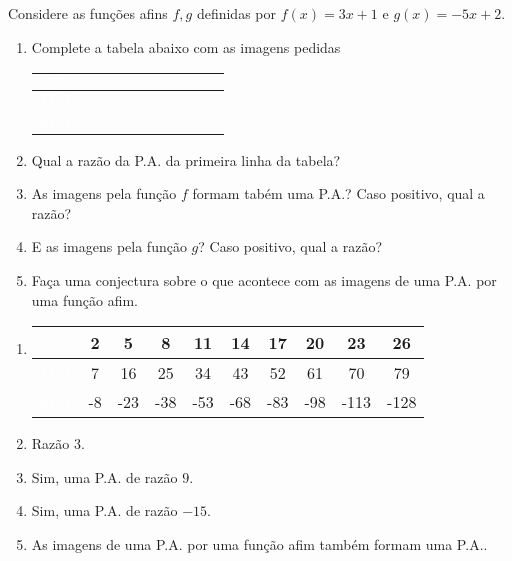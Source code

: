\documentclass[10 pt,usenames,dvipsnames, oneside]{article}
\begin{document}
Considere as funções afins $f,g$ definidas por $f(x)=3x+1$ e $g(x)=-5x+2$.
\begin{enumerate}
\item Complete a tabela abaixo com as imagens pedidas

\begin{table}[H]
\centering
\begin{tabu} to 
\hline
{}\textcolor{white}{} & & & & & & & & & \\
\hline
{}\textcolor{white}{} & & & & & & & & & \\
\hline
{}\textcolor{white}{} & & & & & & & & & \\
\hline
\end{tabu}
\end{table}
\item Qual a razão da P.A. da primeira linha da tabela?
\item As imagens pela função $f$ formam tabém uma P.A.? Caso positivo, qual a razão?
\item E as imagens pela função $g$? Caso positivo, qual a razão?
\item Faça uma conjectura sobre o que acontece com as imagens de uma P.A. por uma função afim.
\end{enumerate}

\ifdefined\prof
\begin{solucao}
\begin{enumerate}
\item {}
{
\begin{tabu} to 
\hline
{}\textcolor{white}{} & 2 & 5 & 8 & 11 & 14 & 17 & 20 & 23 & 26 \\
\hline
{}\textcolor{white}{} & 7 & 16 & 25 & 34 & 43 & 52 & 61 & 70 & 79 \\
\hline
{}\textcolor{white}{} & -8 & -23 & -38 & -53 & -68 & -83 & -98 & -113 & -128 \\
\hline
\end{tabu}
}

\item Razão $3$.
\item Sim, uma P.A. de razão $9$.
\item Sim, uma P.A. de razão $-15$.
\item As imagens de uma P.A. por uma função afim também formam uma P.A..
\end{enumerate}
\end{solucao}
\fi
\end{document}
